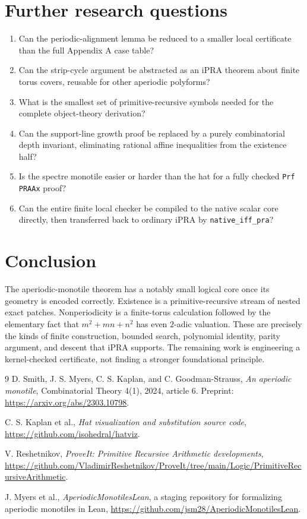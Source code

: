 \documentclass[11pt]{article}
\newcommand{\iPRA}{\mathrm{iPRA}}
\begin{document}
\section{Further research questions}
\begin{enumerate}
\item Can the periodic-alignment lemma be reduced to a smaller local certificate than the
full Appendix A case table?
\item Can the strip-cycle argument be abstracted as an $\iPRA$ theorem about finite torus
covers, reusable for other aperiodic polyforms?
\item What is the smallest set of primitive-recursive symbols needed for the complete
object-theory derivation?
\item Can the support-line growth proof be replaced by a purely combinatorial depth
invariant, eliminating rational affine inequalities from the existence half?
\item Is the spectre monotile easier or harder than the hat for a fully checked
\texttt{Prf PRAAx} proof?
\item Can the entire finite local checker be compiled to the native scalar core directly,
then transferred back to ordinary $\iPRA$ by \texttt{native\_iff\_pra}?
\end{enumerate}

\section*{Conclusion}
The aperiodic-monotile theorem has a notably small logical core once its geometry is
encoded correctly.  Existence is a primitive-recursive stream of nested exact patches.
Nonperiodicity is a finite-torus calculation followed by the elementary fact that
$m^2+mn+n^2$ has even $2$-adic valuation.  These are precisely the kinds of finite
construction, bounded search, polynomial identity, parity argument, and descent that
$\iPRA$ supports.  The remaining work is engineering a kernel-checked certificate, not
finding a stronger foundational principle.

\begin{thebibliography}{9}
D. Smith, J. S. Myers, C. S. Kaplan, and C. Goodman-Strauss,
\emph{An aperiodic monotile}, Combinatorial Theory 4(1), 2024, article 6.
Preprint: \url{https://arxiv.org/abs/2303.10798}.

C. S. Kaplan et al., \emph{Hat visualization and substitution source code},
\url{https://github.com/isohedral/hatviz}.

V. Reshetnikov, \emph{ProveIt: Primitive Recursive Arithmetic developments},
\url{https://github.com/VladimirReshetnikov/ProveIt/tree/main/Logic/PrimitiveRecursiveArithmetic}.


J. Myers et al., \emph{AperiodicMonotilesLean}, a staging repository for formalizing
aperiodic monotiles in Lean, \url{https://github.com/jsm28/AperiodicMonotilesLean}.

\end{thebibliography}
\end{document}

